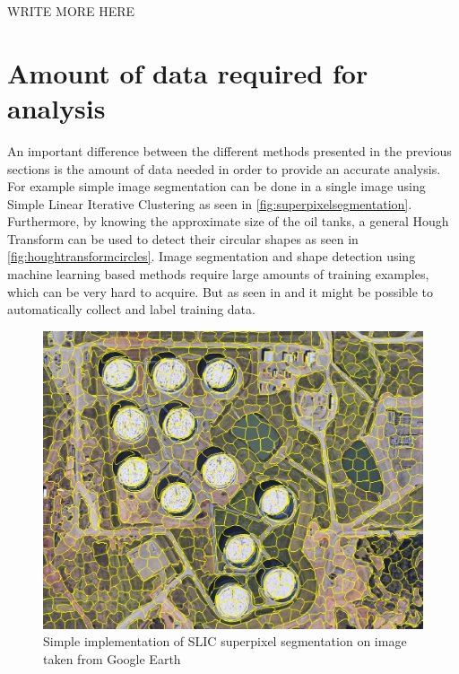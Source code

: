 WRITE MORE HERE

\section{Amount of data required for analysis}
An important difference between the different methods presented in the previous sections is the amount of data needed in order to provide an accurate analysis. For example simple image segmentation can be done in a single image using Simple Linear Iterative Clustering \citep{Achanta2012} as seen in \autoref{fig:superpixelsegmentation}. Furthermore, by knowing the approximate size of the oil tanks, a general Hough Transform \citep{Ballard1981} can be used to detect their circular shapes as seen in \autoref{fig:houghtransformcircles}. Image segmentation and shape detection using machine learning based methods require large amounts of training examples, which can be very hard to acquire. But as seen in \cite{Kaiser2017} and \cite{Kemker2017} it might be possible to automatically collect and label training data.

\begin{figure}[!h]
	\centering
	\includegraphics[scale=0.4]{fig/superpixel_segmentation.png}
	\caption{Simple implementation of SLIC superpixel segmentation on image taken from Google Earth}
	\label{fig:superpixelsegmentation}
\end{figure}

